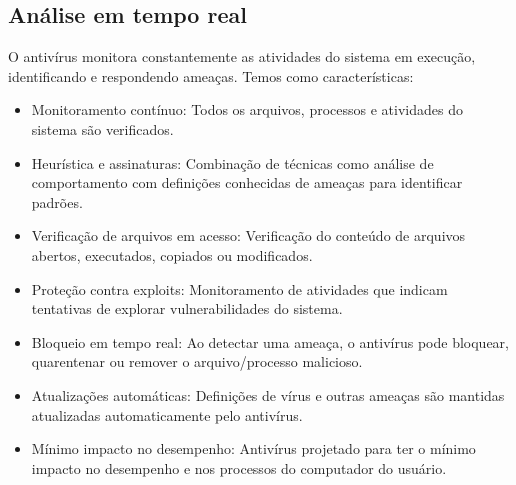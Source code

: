 \documentclass[10pt,conference,twocolumn]{article}
\begin{document}
\subsection*{Análise em tempo real}
O antivírus monitora constantemente as atividades do sistema em execução, identificando e respondendo ameaças. Temos como características:
\begin{itemize}
\item
Monitoramento contínuo: Todos os arquivos, processos e atividades do sistema são verificados.
\item
Heurística e assinaturas: Combinação de técnicas como análise de comportamento com definições conhecidas de ameaças para identificar padrões.
\item
Verificação de arquivos em acesso: Verificação do conteúdo de arquivos abertos, executados, copiados ou modificados.
\item
Proteção contra exploits: Monitoramento de atividades que indicam tentativas de explorar vulnerabilidades do sistema.
\item
Bloqueio em tempo real: Ao detectar uma ameaça, o antivírus pode bloquear, quarentenar ou remover o arquivo/processo malicioso.
\item
Atualizações automáticas: Definições de vírus e outras ameaças são mantidas atualizadas automaticamente pelo antivírus.
\item
Mínimo impacto no desempenho: Antivírus projetado para ter o mínimo impacto no desempenho e nos processos do computador do usuário.
\end{itemize}
\end{document}
